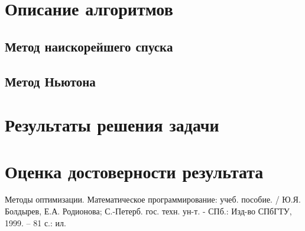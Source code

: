 \documentclass[main.tex]{subfiles}
\begin{document}
\section{Описание алгоритмов}
\subsection{Метод наискорейшего спуска}
\subsection{Метод Ньютона}

\section{Результаты решения задачи}
\section{Оценка достоверности результата}

\begin{thebibliography}{99}
	 Методы оптимизации. Математическое программирование: учеб. пособие. / Ю.Я. Болдырев, Е.А. Родионова; С.-Петерб. гос. техн. ун-т. - СПб.: Изд-во СПбГТУ, 1999. -- 81 с.: ил.
\end{thebibliography}
\end{document}
